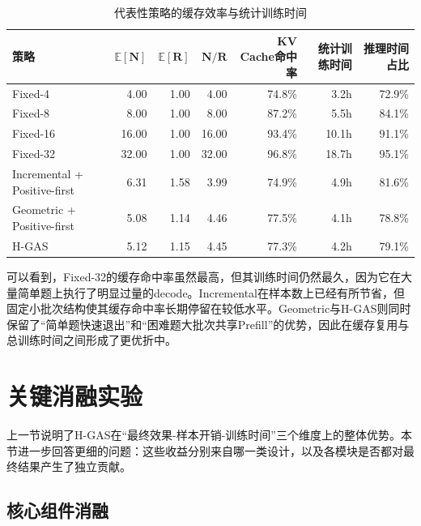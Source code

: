 \begin{table}[htbp]
    \centering
    \caption{代表性策略的缓存效率与统计训练时间}\label{tab:exp_kv_profile}
    \small
    \setlength{\tabcolsep}{3.0pt}
    \renewcommand{\arraystretch}{1.15}
    \begin{tabular}{|l|r|r|r|r|r|r|}
    \hline
    \textbf{策略} & $\boldsymbol{\mathbb{E}[N]}$ & $\boldsymbol{\mathbb{E}[R]}$ & $\boldsymbol{N/R}$ & \textbf{KV Cache命中率} & \textbf{统计训练时间} & \textbf{推理时间占比} \\
    \hline
    Fixed-4                      & 4.00  & 1.00 & 4.00  & 74.8\% & 3.2h  & 72.9\% \\
    Fixed-8                      & 8.00  & 1.00 & 8.00  & 87.2\% & 5.5h  & 84.1\% \\
    Fixed-16                     & 16.00 & 1.00 & 16.00 & 93.4\% & 10.1h & 91.1\% \\
    Fixed-32                     & 32.00 & 1.00 & 32.00 & 96.8\% & 18.7h & 95.1\% \\
    Incremental + Positive-first & 6.31  & 1.58 & 3.99  & 74.9\% & 4.9h  & 81.6\% \\
    Geometric + Positive-first   & 5.08  & 1.14 & 4.46  & 77.5\% & 4.1h  & 78.8\% \\
    H-GAS                        & 5.12  & 1.15 & 4.45  & 77.3\% & 4.2h  & 79.1\% \\
    \hline
    \end{tabular}
\end{table}

可以看到，Fixed-32的缓存命中率虽然最高，但其训练时间仍然最久，因为它在大量简单题上执行了明显过量的decode。Incremental在样本数上已经有所节省，但固定小批次结构使其缓存命中率长期停留在较低水平。Geometric与H-GAS则同时保留了“简单题快速退出”和“困难题大批次共享Prefill”的优势，因此在缓存复用与总训练时间之间形成了更优折中。

\section{关键消融实验}
\label{sec:exp_ablation}

上一节说明了H-GAS在“最终效果-样本开销-训练时间”三个维度上的整体优势。本节进一步回答更细的问题：这些收益分别来自哪一类设计，以及各模块是否都对最终结果产生了独立贡献。

\subsection{核心组件消融}
\label{subsec:exp_ablation_core}

